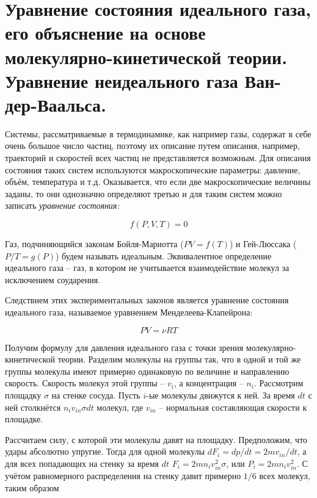 \section{Уравнение состояния идеального газа, его объяснение на основе молекулярно-кинетической теории. Уравнение неидеального газа Ван-дер-Ваальса.}

Системы, рассматриваемые в термодинамике, как например газы, содержат в себе очень большое число частиц, поэтому их описание путем описания, например, траекторий и скоростей всех частиц не представляется возможным. Для описания состояния таких систем используются макроскопические параметры: давление, объём, температура и т.д. Оказывается, что если две макроскопические величины заданы, то они однозначно определяют третью и для таким систем можно записать \textit{уравнение состояния:}

\begin{equation*}
    f(P, V, T) = 0
\end{equation*}

\begin{definition}
    Газ, подчиняющийся законам Бойля-Мариотта ($PV = f(T)$) и Гей-Люссака ($P/T = g(P)$) будем называть идеальным. Эквивалентное определение идеального газа -- газ, в котором не учитывается взаимодействие молекул за исключением соударения.
\end{definition}

Следствием этих экспериментальных законов является уравнение состояния идеального газа, называемое уравнением Менделеева-Клапейрона:

\begin{equation}
    P V = \nu R T
\end{equation}

Получим формулу для давления идеального газа с точки зрения молекулярно-кинетической теории. Разделим молекулы на группы так, что в одной и той же группы молекулы имеют примерно одинаковую по величине и направлению скорость. Скорость молекул этой группы -- $v_i$, а концентрация -- $n_i$. Рассмотрим площадку $\sigma$ на стенке сосуда. Пусть $i$-ые молекулы движутся к ней. За время $dt$ с ней столкнётся $n_i v_{i n} \sigma dt$ молекул, где $v_{in}$ -- нормальная составляющая скорости к площадке.

Рассчитаем силу, с которой эти молекулы давят на площадку. Предположим, что удары абсолютно упругие. Тогда для одной молекулы $dF_i = dp / dt = 2 m v_{in} / dt$, а для всех попадающих на стенку за время $dt$ $F_i = 2 m n_i v_{in}^2 \sigma$, или $P_i = 2 m n_i v_{in}^2$. С учётом равномерного распределения на стенку давит примерно $1/6$ всех молекул, таким образом

